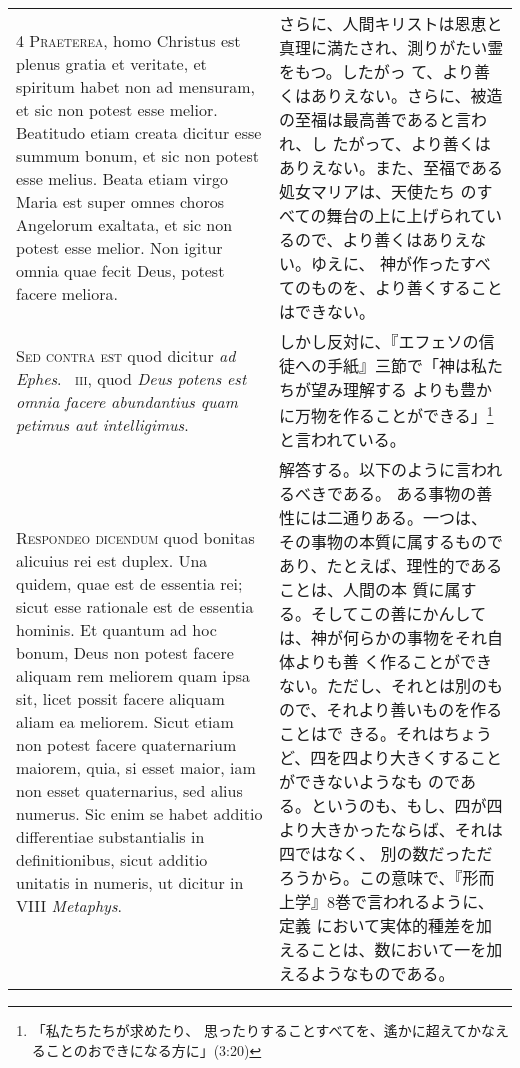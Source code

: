 \documentclass[10pt]{jsarticle} %
\begin{document}
\begin{longtable}{p{21em}p{21em}}
\\


{\scshape 4 Praeterea}, homo Christus est plenus gratia
et veritate, et spiritum habet non ad mensuram, et sic non potest esse
melior. Beatitudo etiam creata dicitur esse summum bonum, et sic non
potest esse melius. Beata etiam virgo Maria est super omnes choros
Angelorum exaltata, et sic non potest esse melior. Non igitur omnia quae
fecit Deus, potest facere meliora.

&

さらに、人間キリストは恩恵と真理に満たされ、測りがたい霊をもつ。したがっ
 て、より善くはありえない。さらに、被造の至福は最高善であると言われ、し
 たがって、より善くはありえない。また、至福である処女マリアは、天使たち
 のすべての舞台の上に上げられているので、より善くはありえない。ゆえに、
 神が作ったすべてのものを、より善くすることはできない。


\\


{\scshape Sed contra est} quod dicitur {\itshape ad Ephes}.~{\scshape
iii}, quod {\itshape Deus potens est omnia facere abundantius quam
petimus aut intelligimus}.


&
しかし反対に、『エフェソの信徒への手紙』三節で「神は私たちが望み理解する
 よりも豊かに万物を作ることができる」\footnote{「私たちたちが求めたり、
 思ったりすることすべてを、遙かに超えてかなえることのおできになる方に」(3:20)}と言われている。
\\


{\scshape Respondeo dicendum} quod bonitas alicuius rei est duplex. Una
quidem, quae est de essentia rei; sicut esse rationale est de essentia
hominis. Et quantum ad hoc bonum, Deus non potest facere aliquam rem
meliorem quam ipsa sit, licet possit facere aliquam aliam ea
meliorem. Sicut etiam non potest facere quaternarium maiorem, quia, si
esset maior, iam non esset quaternarius, sed alius numerus. Sic enim se
habet additio differentiae substantialis in definitionibus, sicut
additio unitatis in numeris, ut dicitur in VIII {\itshape
Metaphys}. 


&

解答する。以下のように言われるべきである。
ある事物の善性には二通りある。一つは、
その事物の本質に属するものであり、たとえば、理性的であることは、人間の本
質に属する。そしてこの善にかんしては、神が何らかの事物をそれ自体よりも善
く作ることができない。ただし、それとは別のもので、それより善いものを作ることはで
きる。それはちょうど、四を四より大きくすることができないようなも
のである。というのも、もし、四が四より大きかったならば、それは四ではなく、
別の数だっただろうから。この意味で、『形而上学』8巻で言われるように、定義
において実体的種差を加えることは、数において一を加えるようなものである。



\end{longtable}
\end{document}
